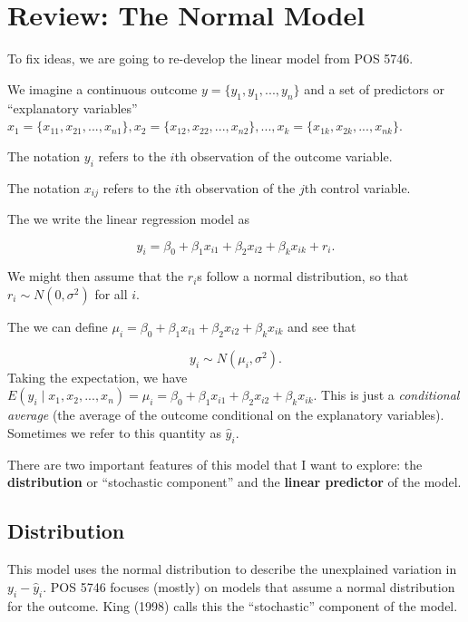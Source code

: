 \documentclass[
]{book}
\begin{document}
\hypertarget{review-the-normal-model}{%
\section{Review: The Normal Model}\label{review-the-normal-model}}

To fix ideas, we are going to re-develop the linear model from POS 5746.

We imagine a continuous outcome \(y = \{y_1, y_1,..., y_n\}\) and a set
of predictors or ``explanatory variables''
\(x_1 = \{x_{11}, x_{21}, ..., x_{n1}\}, x_2 = \{x_{12}, x_{22}, ..., x_{n2}\}, ..., x_k = \{x_{1k}, x_{2k}, ..., x_{nk}\}\).

The notation \(y_i\) refers to the \(i\)th observation of the outcome
variable.

The notation \(x_{ij}\) refers to the \(i\)th observation of the \(j\)th
control variable.

The we write the linear regression model as

\[
y_i = \beta_0 + \beta_1 x_{i1} + \beta_2 x_{i2} + \beta_k x_{ik} + r_i.
\]

We might then assume that the \(r_i\)s follow a normal distribution, so
that \(r_i \sim N(0, \sigma^2)\) for all \(i\).

The we can define
\(\mu_i = \beta_0 + \beta_1 x_{i1} + \beta_2 x_{i2} + \beta_k x_{ik}\)
and see that

\[
y_i \sim N(\mu_i, \sigma^2).
\] Taking the expectation, we have
\(E(y_i \mid x_1, x_2, ... , x_n) = \mu_i = \beta_0 + \beta_1 x_{i1} + \beta_2 x_{i2} + \beta_k x_{ik}\).
This is just a \emph{conditional average} (the average of the outcome
conditional on the explanatory variables). Sometimes we refer to this
quantity as \(\hat{y}_i\).

There are two important features of this model that I want to explore:
the \textbf{distribution} or ``stochastic component'' and the
\textbf{linear predictor} of the model.

\hypertarget{distribution}{%
\subsection{Distribution}\label{distribution}}

This model uses the normal distribution to describe the unexplained
variation in \(y_i - \hat{y}_i\). POS 5746 focuses (mostly) on models
that assume a normal distribution for the outcome. King (1998) calls
this the ``stochastic'' component of the model.
\end{document}
